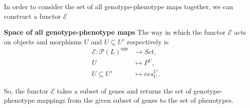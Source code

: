 \begin{frame}
In order to consider the set of all genotype-phenotype maps together, we can construct a functor $\mathcal{E}$
\begin{block}{\textbf{Space of all genotype-phenotype maps}}
The way in which the functor $\mathcal{E}$ acts on objects and morphisms $U$ and $U \subseteq U'$ respectively is
\begin{equation}\label{eq:gpfunctor}
\begin{split}
\mathcal{E} \colon \mathcal{P}(L)^{opp} &\rightarrow Set,\\
U &\mapsto P^U,\\
U \subseteq U' &\mapsto res^{U'}_{U}.
\end{split}
\end{equation}
\end{block}
So, the functor $\mathcal{E}$ takes a subset of genes and returns the set of genotype-phenotype mappings from the given subset of genes to the set of phenotypes.
\end{frame}
